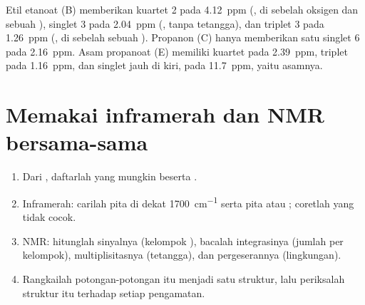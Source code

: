 \begin{example}\label{ex:g12:proton-nmr:reading}
Etil etanoat (B) memberikan kuartet 2  pada \qty{4.12}{ppm}
(, di sebelah oksigen dan sebuah ), singlet 3 
pada \qty{2.04}{ppm} (, tanpa  tetangga), dan triplet
3  pada \qty{1.26}{ppm} (, di sebelah sebuah ).
Propanon (C) hanya memberikan satu singlet 6  pada
\qty{2.16}{ppm}. Asam propanoat (E) memiliki kuartet pada
\qty{2.39}{ppm}, triplet pada \qty{1.16}{ppm}, dan singlet jauh di
kiri, pada \qty{11.7}{ppm}, yaitu  asamnya.
\end{example}

\section{Memakai inframerah dan NMR bersama-sama}


\begin{method}\label{met:g12:proton-nmr:identify}
\begin{enumerate}
  \item Dari , daftarlah  yang mungkin
        beserta .
  \item Inframerah: carilah pita  di dekat \qty{1700}{cm^{-1}}
        serta pita  atau ; coretlah  yang tidak
        cocok.
  \item NMR: hitunglah sinyalnya (kelompok ), bacalah
        integrasinya (jumlah  per kelompok), multiplisitasnya
        (tetangga), dan pergeserannya (lingkungan).
  \item Rangkailah potongan-potongan itu menjadi satu struktur, lalu
        periksalah struktur itu terhadap setiap pengamatan.
\end{enumerate}
\end{method}

